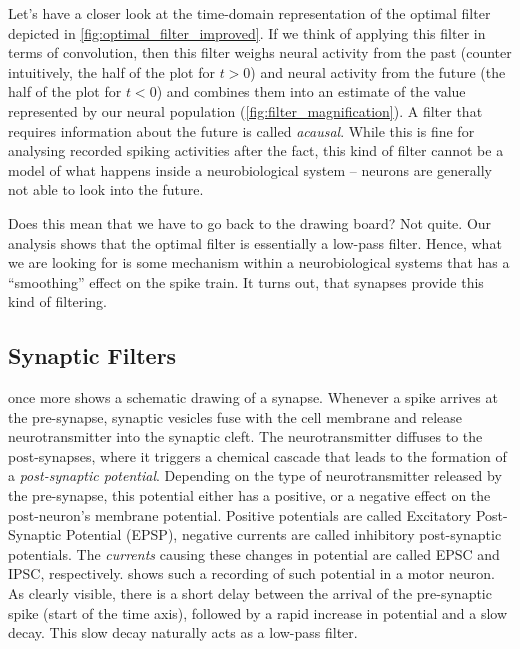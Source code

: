 \documentclass[10pt,letterpaper,oneside]{article}
\begin{document}
Let's have a closer look at the time-domain representation of the optimal filter depicted in \cref{fig:optimal_filter_improved}. If we think of applying this filter in terms of convolution, then this filter weighs neural activity from the past (counter intuitively, the half of the plot for $t > 0$) and neural activity from the future (the half of the plot for $t < 0$) and combines them into an estimate of the value represented by our neural population (\cref{fig:filter_magnification}). A filter that requires information about the future is called \emph{acausal}. While this is fine for analysing recorded spiking activities after the fact, this kind of filter cannot be a model of what happens inside a neurobiological system -- neurons are generally not able to look into the future.

Does this mean that we have to go back to the drawing board? Not quite. Our analysis shows that the optimal filter is essentially a low-pass filter. Hence, what we are looking for is some mechanism within a neurobiological systems that has a \enquote{smoothing} effect on the spike train. It turns out, that synapses provide this kind of filtering.

\subsection{Synaptic Filters}

 once more shows a schematic drawing of a synapse. Whenever a spike arrives at the pre-synapse, synaptic vesicles fuse with the cell membrane and release neurotransmitter into the synaptic cleft. The neurotransmitter diffuses to the post-synapses, where it triggers a chemical cascade that leads to the formation of a \emph{post-synaptic potential}. Depending on the type of neurotransmitter released by the pre-synapse, this potential either has a positive, or a negative effect on the post-neuron's membrane potential. Positive potentials are called Excitatory Post-Synaptic Potential (EPSP), negative currents are called inhibitory post-synaptic potentials. The \emph{currents} causing these changes in potential are called EPSC and IPSC, respectively.  shows such a recording of such potential in a motor neuron. As clearly visible, there is a short delay between the arrival of the pre-synaptic spike (start of the time axis), followed by a rapid increase in potential and a slow decay. This slow decay naturally acts as a low-pass filter.
\end{document}
